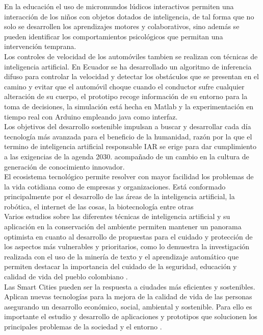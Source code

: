\documentclass[preprint,12pt,3p]{elsarticle}
\begin{document}
En la educación el uso de micromundos lúdicos interactivos permiten una interacción de los niños con objetos dotados de inteligencia, de tal forma que no solo se desarrollen los aprendizajes motores y colaborativos, sino además se pueden identificar los comportamientos psicológicos que permitan una intervención temprana. \cite{cayambe2016inteligencia}\\

Los controles de velocidad de los automóviles tambien se realizan con técnicas de inteligencia artificial. En Ecuador se ha desarrollado un algoritmo de inferencia difuso para controlar la velocidad y detectar los obstáculos que se presentan en el camino y evitar que el automóvil choque cuando el conductor sufre cualquier alteración de su cuerpo, el prototipo recoge información de su entorno para la toma de decisiones, la simulación está hecha en Matlab y la experimentación en tiempo real con Arduino empleando java como interfaz. \cite{mejia2019control}\\

Los objetivos del desarrollo sostenible impulsan a buscar y desarrollar cada día tecnología más avanzada para el beneficio de la humanidad, razón por la que el termino de inteligencia artificial responsable IAR se erige para dar cumplimiento a las exigencias de la agenda 2030.\cite{rodriguez2019modelo} acompañado de un cambio en la cultura de generación de conocimiento innovador.\\

El ecosistema tecnológico permite resolver con mayor facilidad los problemas de la vida cotidiana como de empresas y organizaciones. Está conformado principalmente por el desarrollo de las áreas de la inteligencia artificial, la robótica, el internet de las cosas, la biotecnología entre otras \cite{pinillos2019pasado}\\

Varios estudios sobre las diferentes técnicas de inteligencia artificial y su aplicación en la conservación del ambiente permiten mantener un panorama optimista en cuanto al desarrollo de propuestas para el cuidado y protección de los aspectos más vulnerables y prioritarios, como lo demuestra la investigación realizada con el uso de la minería de texto y el aprendizaje automático que permiten destacar la importancia del cuidado de la seguridad, educación y calidad de vida del pueblo colombiano \cite{gomez2019mineria}.\\

Las Smart Cities pueden ser la respuesta a ciudades más eficientes y sostenibles. Aplican nuevas tecnologías para la mejora de la calidad de vida de las personas asegurando un desarrollo económico, social, ambiental y sostenible. Para ello es importante el estudio y desarrollo de aplicaciones y prototipos que solucionen los principales problemas de la sociedad y el entorno \cite{villagra2019hacia}.\\ 
\end{document}
